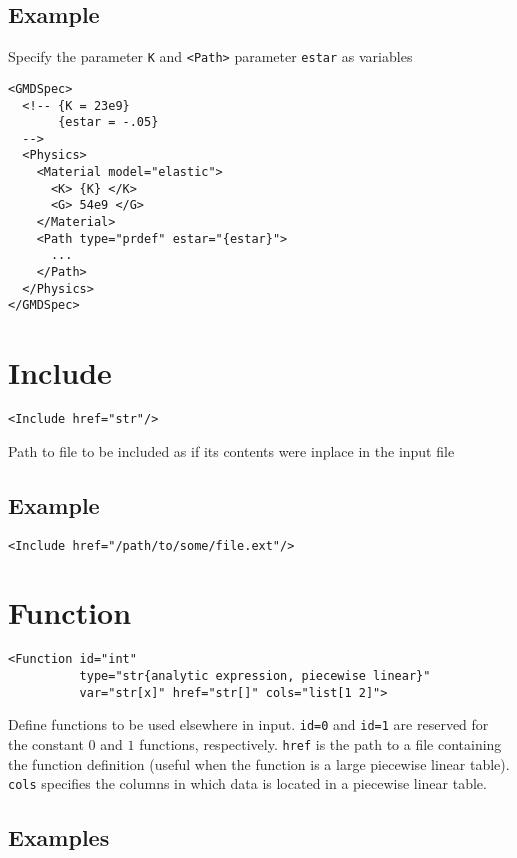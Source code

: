 \documentclass[11pt]{report}
\renewcommand{\tag}[1]{\texttt{<#1>}}
\newcommand{\reqdtag}[1]{\Red{\texttt{<#1>}}}
\begin{document}
\subsection{Example}
Specify the \reqdtag{Material} parameter \texttt{K} and \tag{Path} parameter
\texttt{estar} as variables
\begin{verbatim}
<GMDSpec>
  <!-- {K = 23e9}
       {estar = -.05}
  -->
  <Physics>
    <Material model="elastic">
      <K> {K} </K>
      <G> 54e9 </G>
    </Material>
    <Path type="prdef" estar="{estar}">
      ...
    </Path>
  </Physics>
</GMDSpec>
\end{verbatim}

\section{Include}
\begin{verbatim}
<Include href="str"/>
\end{verbatim}
%
Path to file to be included as if its contents were inplace in the input file

\subsection{Example}
\begin{verbatim}
<Include href="/path/to/some/file.ext"/>
\end{verbatim}

\section{Function}
\begin{verbatim}
<Function id="int"
          type="str{analytic expression, piecewise linear}"
          var="str[x]" href="str[]" cols="list[1 2]">
\end{verbatim}
%
Define functions to be used elsewhere in input. \texttt{id=0} and
\texttt{id=1} are reserved for the constant $0$ and $1$ functions,
respectively. \texttt{href} is the path to a file containing the function
definition (useful when the function is a large piecewise linear table).
\texttt{cols} specifies the columns in which data is located in a piecewise
linear table.

\subsection{Examples}
\end{document}
